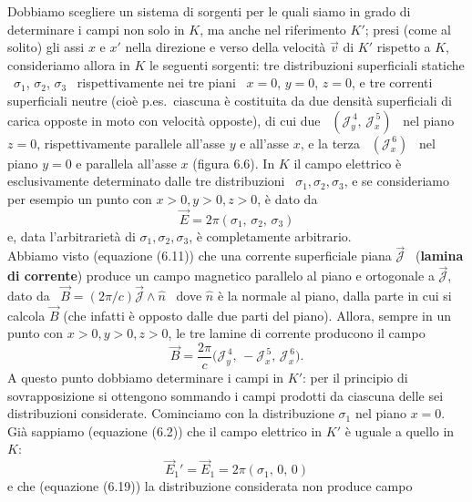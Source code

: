 Dobbiamo scegliere un sistema di sorgenti per le quali siamo in grado di
determinare i campi non solo in $K$, ma anche nel riferimento $K'$; presi (come
al solito) gli assi $x$ e $x'$ nella direzione e verso della velocit\`a $\vec v$
di $K'$ rispetto a $K$, consideriamo allora in $K$ le seguenti sorgenti: tre
distribuzioni superficiali statiche \ $\sigma_1$, $\sigma_2$, $\sigma_3$
\ rispettivamente nei tre piani \ $x=0$, $y=0$, $z=0$, e tre correnti
superficiali neutre (cio\`e p.es.\ ciascuna \`e costituita da due densit\`a
superficiali di carica opposte in moto con velocit\`a opposte), di cui due
\ $(\mathcal J_y^{\,4},\,\mathcal J_x^{\,5})$ \ nel piano $z=0$, rispettivamente
parallele all'asse $y$ e all'asse $x$, e la terza \ $(\mathcal J_x^{\,6})$ \ nel
piano $y=0$ e parallela all'asse $x$ (figura 6.6).
In $K$ il campo elettrico \`e esclusivamente determinato dalle tre distribuzioni
\ $\sigma_1,\sigma_2,\sigma_3$, e se consideriamo per esempio un punto con
$x>0,y>0,z>0$, \`e dato da
\begin{equation}
  \vec E=2\pi(\sigma_1,\,\sigma_2,\,\sigma_3)
  \tag{6.23}
\end{equation}
e, data l'arbitrariet\`a di $\sigma_1,\sigma_2,\sigma_3$, \`e completamente
arbitrario.\\
Abbiamo visto \big(equazione (6.11)\big) che una corrente superficiale piana
$\vec{\mathcal J}$ \ (\textbf{lamina di corrente}) produce un campo magnetico
parallelo al piano e ortogonale a $\vec{\mathcal J}$, dato da
\ $\vec B=(2\pi/c)\vec{\mathcal J}\wedge\hat n$ \ dove $\hat n$ \`e la normale
al piano, dalla parte in cui si calcola $\vec B$ (che infatti \`e opposto dalle
due parti del piano). Allora, sempre in un punto con $x>0,y>0,z>0$, le tre
lamine di corrente producono il campo
\begin{equation}
  \vec B=\frac{2\pi}{c}
  \big(\mathcal J_y^{\,4},\,-\mathcal J_x^{\,5},\,\mathcal J_x^{\,6}\big).
  \tag{6.24}
\end{equation}
A questo punto dobbiamo determinare i campi in $K'$: per il principio di
sovrapposizione si ottengono sommando i campi prodotti da ciascuna delle sei
distribuzioni considerate. Cominciamo con la distribuzione $\sigma_1$ nel piano
$x=0$. Gi\`a sappiamo \big(equazione (6.2)\big) che il campo elettrico in $K'$
\`e uguale a quello in $K$:
\begin{equation}
  \vec E_1'=\vec E_1=2\pi(\sigma_1,\,0,\,0)
  \tag{6.25}
\end{equation}
e che \big(equazione (6.19)\big) la distribuzione considerata non produce campo
